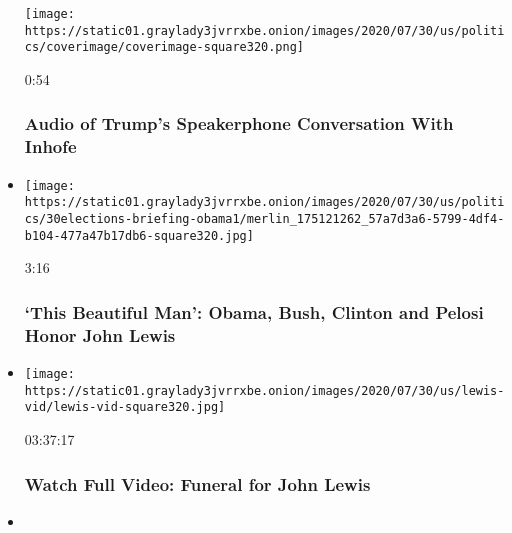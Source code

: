 \begin{itemize}
  \texttt{[image: https://static01.graylady3jvrrxbe.onion/images/2020/07/30/us/politics/coverimage/coverimage-square320.png]}

  0:54

  \hypertarget{audio-of-trumps-speakerphone-conversation-with-inhofe}{%
  \subsubsection{Audio of Trump's Speakerphone Conversation With
  Inhofe}\label{audio-of-trumps-speakerphone-conversation-with-inhofe}}
\item
  \href{https://www.nytimes3xbfgragh.onion/video/us/politics/100000007264823/john-lewis-funeral.html?action=click\&module=video-series-bar\&region=header\&pgtype=Article\&playlistId=video/us-politics}{}

  \texttt{[image: https://static01.graylady3jvrrxbe.onion/images/2020/07/30/us/politics/30elections-briefing-obama1/merlin\_175121262\_57a7d3a6-5799-4df4-b104-477a47b17db6-square320.jpg]}

  3:16

  \hypertarget{this-beautiful-man-obama-bush-clinton-and-pelosi-honor-john-lewis}{%
  \subsubsection{`This Beautiful Man': Obama, Bush, Clinton and Pelosi
  Honor John
  Lewis}\label{this-beautiful-man-obama-bush-clinton-and-pelosi-honor-john-lewis}}
\item
  \href{https://www.nytimes3xbfgragh.onion/video/us/politics/100000007264379/john-lewis-funeral.html?action=click\&module=video-series-bar\&region=header\&pgtype=Article\&playlistId=video/us-politics}{}

  \texttt{[image: https://static01.graylady3jvrrxbe.onion/images/2020/07/30/us/lewis-vid/lewis-vid-square320.jpg]}

  03:37:17

  \hypertarget{watch-full-video-funeral-for-john-lewis}{%
  \subsubsection{Watch Full Video: Funeral for John
  Lewis}\label{watch-full-video-funeral-for-john-lewis}}
\item
  \href{https://www.nytimes3xbfgragh.onion/video/us/politics/100000007261010/barr-johnson-roger-stone-trump.html?action=click\&module=video-series-bar\&region=header\&pgtype=Article\&playlistId=video/us-politics}{}


\end{itemize}
